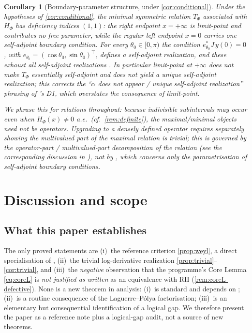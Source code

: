 \documentclass[12pt,a4paper]{amsart}
\theoremstyle{plain}
\newtheorem{corollary}[theorem]{Corollary}
\theoremstyle{definition}
\newcommand{\Ham}{H}
\begin{document}
\begin{corollary}[Boundary-parameter structure, under
\cref{cor:conditional}]\label{cor:alpha}
  Under the hypotheses of \cref{cor:conditional}, the minimal symmetric
  \emph{relation} $T_\Phi$ associated with $\Ham_\Phi$ has deficiency
  indices $(1,1)$: the right endpoint $x=+\infty$ is limit-point and
  contributes no free parameter, while the regular left endpoint $x=0$
  carries one self-adjoint boundary condition.  For every
  $\theta_0\in[0,\pi)$ the condition $e_{\theta_0}^{*}J\,y(0)=0$, with
  $e_{\theta_0} = (\cos\theta_0,\sin\theta_0)^{\top}$, defines a
  self-adjoint realization, and these exhaust all self-adjoint
  realizations \cite[Theorem~2.25]{Remling2018}.  In particular
  limit-point at $+\infty$ does \emph{not} make $T_\Phi$ essentially
  self-adjoint and does \emph{not} yield a \emph{unique} self-adjoint
  realization; this corrects the ``$\alpha$ does not appear / unique
  self-adjoint realization'' phrasing of \cite{SpecRoadmap}'s D1, which
  overstates the consequence of limit-point.

  We phrase this for relations throughout: because indivisible
  subintervals may occur even when $\Ham_\Phi(x)\neq0$ a.e.\ (cf.\
  \cref{rem:definite}), the maximal/minimal objects need not be operators.
  Upgrading to a densely defined operator requires separately showing the
  multivalued part of the maximal relation is trivial; this is governed by
  the operator-part / multivalued-part decomposition of the relation (see
  the corresponding discussion in \cite{Remling2018}), not by
  \cite[Theorem~2.25]{Remling2018}, which concerns only the parametrisation
  of self-adjoint boundary conditions.
\end{corollary}

\section{Discussion and scope}
\label{sec:discussion}

\subsection{What this paper establishes}

The only proved statements are (i)~the reference criterion
\cref{prop:weyl}, a direct specialisation of
\cite[Theorem~3.5]{Remling2018}, (ii)~the trivial log-derivative
realization \cref{prop:trivial}--\cref{cor:trivial}, and (iii)~the
\emph{negative} observation that the programme's Core Lemma
\cref{eq:coreL} is \emph{not justified as written} as an equivalence with
RH (\cref{rem:coreL-defective}).  None is a new theorem in analysis:
(i)~is standard and depends on \cite{Remling2018}; (ii)~is a routine
consequence of the Laguerre--P\'olya factorisation; (iii)~is an
elementary but consequential identification of a logical gap.  We
therefore present the paper as a reference note plus a logical-gap audit,
not a source of new theorems.
\end{document}

